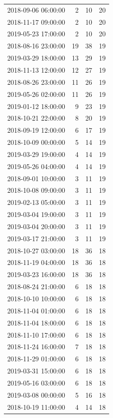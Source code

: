 \begin{tabular}{lrrr}
2018-09-06 06:00:00 & 2 & 10 & 20 \\
2018-11-17 09:00:00 & 2 & 10 & 20 \\
2019-05-23 17:00:00 & 2 & 10 & 20 \\
2018-08-16 23:00:00 & 19 & 38 & 19 \\
2019-03-29 18:00:00 & 13 & 29 & 19 \\
2018-11-13 12:00:00 & 12 & 27 & 19 \\
2018-08-26 23:00:00 & 11 & 26 & 19 \\
2019-05-26 02:00:00 & 11 & 26 & 19 \\
2019-01-12 18:00:00 & 9 & 23 & 19 \\
2018-10-21 22:00:00 & 8 & 20 & 19 \\
2018-09-19 12:00:00 & 6 & 17 & 19 \\
2018-10-09 00:00:00 & 5 & 14 & 19 \\
2019-03-29 19:00:00 & 4 & 14 & 19 \\
2019-05-26 04:00:00 & 4 & 14 & 19 \\
2018-09-01 10:00:00 & 3 & 11 & 19 \\
2018-10-08 09:00:00 & 3 & 11 & 19 \\
2019-02-13 05:00:00 & 3 & 11 & 19 \\
2019-03-04 19:00:00 & 3 & 11 & 19 \\
2019-03-04 20:00:00 & 3 & 11 & 19 \\
2019-03-17 21:00:00 & 3 & 11 & 19 \\
2018-10-27 03:00:00 & 18 & 36 & 18 \\
2018-11-19 04:00:00 & 18 & 36 & 18 \\
2019-03-23 16:00:00 & 18 & 36 & 18 \\
2018-08-24 21:00:00 & 6 & 18 & 18 \\
2018-10-10 10:00:00 & 6 & 18 & 18 \\
2018-11-04 01:00:00 & 6 & 18 & 18 \\
2018-11-04 18:00:00 & 6 & 18 & 18 \\
2018-11-10 17:00:00 & 6 & 18 & 18 \\
2018-11-24 16:00:00 & 7 & 18 & 18 \\
2018-11-29 01:00:00 & 6 & 18 & 18 \\
2019-03-31 15:00:00 & 6 & 18 & 18 \\
2019-05-16 03:00:00 & 6 & 18 & 18 \\
2019-03-08 00:00:00 & 5 & 16 & 18 \\
2018-10-19 11:00:00 & 4 & 14 & 18 \\

\end{tabular}
